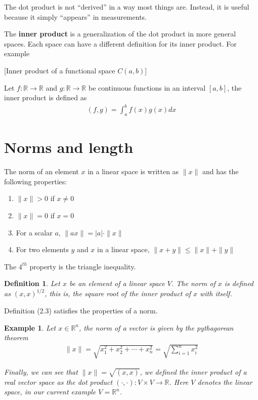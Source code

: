 \documentclass{book}
\newtheorem{example}{Example}[chapter]
\newtheorem{definition}{Definition}[chapter]
\begin{document}
The dot product is not ``derived'' in a way most things are. Instead, it is
useful because it simply ``appears'' in measurements.

The \textbf{inner product} is a generalization of the dot product in more
general spaces. Each space can have a different definition for its inner
product. For example

    [Inner product of a functional space $C(a,b)$]

Let $f:\mathbb{R} \to \mathbb{R}$ and $g:\mathbb{R} \to \mathbb{R}$ be
continuous functions in an interval $[a,b]$, the inner product is defined as
\begin{equation}
    \begin{split}
        \left(f,g\right) = \int_{a}^{b}{f(x)g(x)dx}
    \end{split}
\end{equation}

\section{Norms and length}

The norm of an element $x$ in a linear space is written as $\|x\|$ and has the
following properties:

\begin{enumerate}
    \item $\|x\| > 0$ if $x\neq 0$
    \item $\|x\| = 0$ if $x = 0$
    \item For a scalar $a$, $\|ax\| = |a|\cdot \|x\|$
    \item For two elements $y$ and $x$ in a linear space, $\|x+y\| \leq \|x\| + \|y\|$
\end{enumerate}

The $4^{th}$ property is the triangle inequality.

\begin{definition}
    Let $x$ be an element of a linear space $V$.
    The norm of $x$ is defined as $\left(x,x\right)^{1/2}$, this is,
    the square root of the inner product of $x$ with itself.
\end{definition}

Definition (2.3) satisfies the properties of a norm.

\begin{example}
    Let $x\in\mathbb{R}^{n}$, the norm of a vector is given by the pythagorean theorem
    \begin{equation*}
        \begin{split}
            \|x\| = \sqrt{x_1^{2} + x_2^{2} + \cdots + x_n^{2}}
            = \sqrt{\sum_{i=1}^{n}{x_i^{2}}}
        \end{split}
    \end{equation*}

    Finally, we can see that $\|x\|=\sqrt{\left(x,x\right)}$, we defined the inner
    product of a real vector space as the dot product $\left(\cdot, \cdot\right):
        V\times V \to \mathbb{R}$. Here $V$ denotes the linear space, in our current
    example $V=\mathbb{R}^{n}$.
\end{example}
\end{document}
